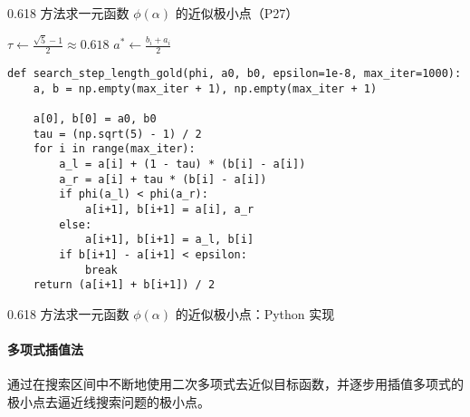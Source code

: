 \documentclass[cn,mtpro2,12pt]{elegantbook}
\begin{document}
\begin{algorithm}
    \caption{0.618 方法求一元函数 $\phi\left(\alpha\right)$ 的近似极小点（P27）}
    $\tau\leftarrow \frac{\sqrt{5}-1}{2}\approx 0.618$\;
    $a^{*}\leftarrow\frac{b_{i}+a_{i}}{2}$\;
\end{algorithm}

\begin{listing}
    \begin{verbatim}
def search_step_length_gold(phi, a0, b0, epsilon=1e-8, max_iter=1000):
    a, b = np.empty(max_iter + 1), np.empty(max_iter + 1)

    a[0], b[0] = a0, b0
    tau = (np.sqrt(5) - 1) / 2
    for i in range(max_iter):
        a_l = a[i] + (1 - tau) * (b[i] - a[i])
        a_r = a[i] + tau * (b[i] - a[i])
        if phi(a_l) < phi(a_r):
            a[i+1], b[i+1] = a[i], a_r
        else:
            a[i+1], b[i+1] = a_l, b[i]
        if b[i+1] - a[i+1] < epsilon:
            break
    return (a[i+1] + b[i+1]) / 2
    \end{verbatim}
    \caption{0.618 方法求一元函数 $\phi\left(\alpha\right)$ 的近似极小点：Python 实现}
\end{listing}

\paragraph{多项式插值法}

通过在搜索区间中不断地使用二次多项式去近似目标函数，并逐步用插值多项式的极小点去逼近线搜索问题的极小点。
\end{document}
